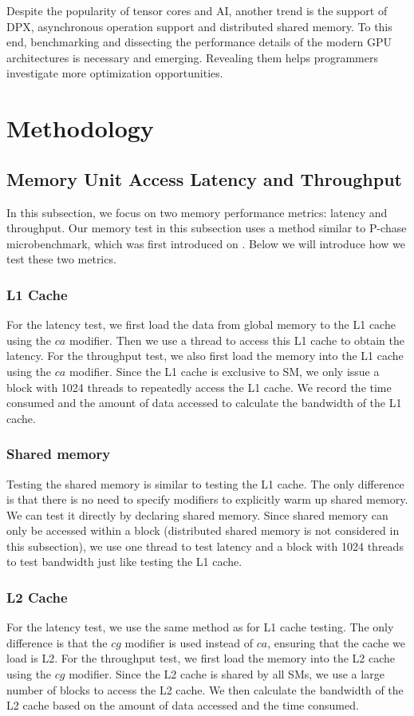 Despite the popularity of tensor cores and AI, another trend is the support of DPX, asynchronous operation support and distributed shared memory. To this end, benchmarking and dissecting the performance details of the modern GPU architectures is necessary and emerging. Revealing them helps programmers investigate more optimization opportunities.

\section{Methodology}
\subsection{Memory Unit Access Latency and Throughput} In this subsection, we focus on two memory performance metrics: latency and throughput. Our memory test in this subsection uses a method similar to P-chase microbenchmark, which was first introduced on \cite{Saavedra_Smith_1995}\cite{Saavedra_Barrera_1992}. Below we will introduce how we test these two metrics. 
\subsubsection{L1 Cache} For the latency test, we first load the data from global memory to the L1 cache using the $ca$ modifier. Then we use a thread to access this L1 cache to obtain the latency. For the throughput test, we also first load the memory into the L1 cache using the $ca$ modifier. Since the L1 cache is exclusive to SM, we only issue a block with 1024 threads to repeatedly access the L1 cache. We record the time consumed and the amount of data accessed to calculate the bandwidth of the L1 cache.
\subsubsection{Shared memory} Testing the shared memory is similar to testing the L1 cache. The only difference is that there is no need to specify modifiers to explicitly warm up shared memory. We can test it directly by declaring shared memory. Since shared memory can only be accessed within a block (distributed shared memory is not considered in this subsection), we use one thread to test latency and a block with 1024 threads to test bandwidth just like testing the L1 cache.

\subsubsection{L2 Cache} For the latency test, we use the same method as for L1 cache testing. The only difference is that the $cg$ modifier is used instead of $ca$, ensuring that the cache we load is L2. For the throughput test, we first load the memory into the L2 cache using the $cg$ modifier. Since the L2 cache is shared by all SMs, we use a large number of blocks to access the L2 cache. We then calculate the bandwidth of the L2 cache based on the amount of data accessed and the time consumed.

